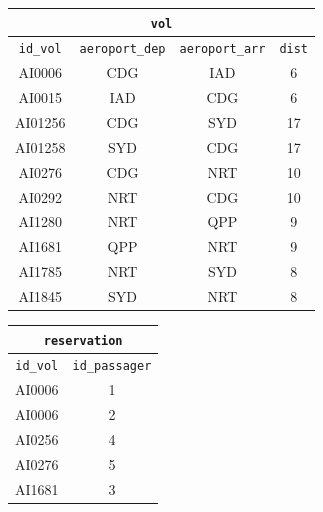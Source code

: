 \begin{table}[h]
    \begin{minipage}[t]{0.48\textwidth}
        \centering
        \small %
        \begin{tabular}{|c|c|c|c|}
            \hline
            \multicolumn{4}{|c|}{\texttt{vol}} \\ \hline
            \texttt{id\_vol} & \texttt{aeroport\_dep} & \texttt{aeroport\_arr} & \texttt{dist} \\ \hline
            AI0006  & CDG & IAD & 6  \\ \hline
            AI0015  & IAD & CDG & 6  \\ \hline
            AI01256 & CDG & SYD & 17 \\ \hline
            AI01258 & SYD & CDG & 17 \\ \hline
            AI0276  & CDG & NRT & 10 \\ \hline
            AI0292  & NRT & CDG & 10 \\ \hline
            AI1280  & NRT & QPP & 9  \\ \hline
            AI1681  & QPP & NRT & 9  \\ \hline
            AI1785  & NRT & SYD & 8  \\ \hline
            AI1845  & SYD & NRT & 8  \\ \hline
        \end{tabular}
    \end{minipage}
    \hfill
    \begin{minipage}[t]{0.48\textwidth}
        \centering
        \begin{tabular}{|c|c|}
            \hline
            \multicolumn{2}{|c|}{\texttt{reservation}} \\ \hline
            \texttt{id\_vol} & \texttt{id\_passager} \\ \hline
            AI0006 & 1 \\ \hline
            AI0006 & 2 \\ \hline
            AI0256 & 4 \\ \hline
            AI0276 & 5 \\ \hline
            AI1681 & 3 \\ \hline
        \end{tabular}
    \end{minipage}

\end{table}
